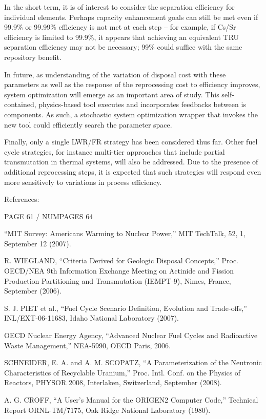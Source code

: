	In the short term, it is of interest to consider the separation
efficiency for individual elements.  Perhaps capacity enhancement goals
can still be met even if 99.9\% or 99.99\% efficiency is not met at each
step -- for example, if Cs/Sr efficiency is limited to 99.9\%, it
appears that achieving an equivalent TRU separation efficiency may not
be necessary; 99\% could suffice with the same repository benefit.  

	In future, as understanding of the variation of disposal cost with
these parameters as well as the response of the reprocessing cost to
efficiency improves, system optimization will emerge as an important
area of study.  This self-contained, physics-based tool executes and
incorporates feedbacks between is components.  As such, a stochastic
system optimization wrapper that invokes the new tool could efficiently
search the parameter space.

	Finally, only a single LWR/FR strategy has been considered thus far. 
Other fuel cycle strategies, for instance multi-tier approaches that
include partial transmutation in thermal systems, will also be
addressed.  Due to the presence of additional reprocessing steps, it is
expected that such strategies will respond even more sensitively to
variations in process efficiency.

References:

  PAGE  61 /  NUMPAGES  64 

 ``MIT Survey: Americans Warming to Nuclear Power,'' MIT TechTalk, 52,
1, September 12 (2007).

 R. WIEGLAND, ``Criteria Derived for Geologic Disposal Concepts,'' Proc.
OECD/NEA 9th Information Exchange Meeting on Actinide and Fission
Production Partitioning and Transmutation (IEMPT-9), Nimes, France,
September (2006).

 S. J. PIET et al., ``Fuel Cycle Scenario Definition, Evolution and
Trade-offs,'' INL/EXT-06-11683, Idaho National Laboratory (2007).

 OECD Nuclear Energy Agency, ``Advanced Nuclear Fuel Cycles and
Radioactive Waste Management,'' NEA-5990, OECD Paris, 2006.

 SCHNEIDER, E. A. and A. M. SCOPATZ, ``A Parameterization of the
Neutronic Characteristics of Recyclable Uranium,'' Proc. Intl. Conf. on
the Physics of Reactors, PHYSOR 2008, Interlaken, Switzerland, September
(2008).

 A. G. CROFF, ``A User's Manual for the ORIGEN2 Computer Code,''
Technical Report ORNL-TM/7175, Oak Ridge National Laboratory (1980).

